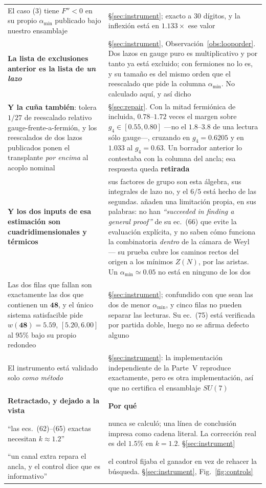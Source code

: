\documentclass[11pt,a4paper]{article}
\newcommand{\su}[1]{SU(#1)}
\newcommand{\rep}[1]{\mathbf{#1}}
\newcommand{\amin}{\alpha_{\min}}
\begin{document}
\begin{longtable}{p{}p{}}
El caso (3) tiene $F''<0$ en su propio $\amin$ publicado bajo nuestro ensamblaje &
\S\ref{sec:instrument}; exacto a 30 dígitos, y la inflexión está en $1.133\times$ ese valor\\
\rowcolor{hdrblue!7}\textbf{La lista de exclusiones anterior es la lista de \emph{un lazo}} &
\S\ref{sec:instrument}, Observación~\ref{obs:looporder}. Dos lazos en gauge puro es multiplicativo y
por tanto ya está excluido; con fermiones no lo es, y su tamaño es del mismo orden que el reescalado
que pide la columna $\amin$. No calculado aquí, y así dicho\\
\rowcolor{warmred!12}\textbf{Y la cuña también}: tolera $1/27$ de reescalado relativo
gauge-frente-a-fermión, y los reescalados de dos lazos publicados ponen el transplante
\emph{por encima} al acoplo nominal &
\S\ref{sec:repair}. Con la mitad fermiónica de \cite{GuoDu} incluida, $0.78$--$1.72$ veces el margen
sobre $g_4\in[0.55,0.80]$ ---no el $1.8$--$3.8$ de una lectura sólo gauge---, cruzando en
$g_4=0.6205$ y en $1.033$ al $g_4=0.63$. Un borrador anterior lo contestaba con la columna del
ancla; esa respuesta queda \textbf{retirada}\\
\rowcolor{warmred!12}\textbf{Y los dos inputs de esa estimación son cuadridimensionales y térmicos} &
sus factores de grupo son esta álgebra, sus integrales de lazo no, y el $6/5$ está hecho de las
segundas. \cite{DGKA} añaden una limitación propia, en sus palabras: no han \emph{``succeeded in
finding a general proof''} de su ec.~(66) que evite la evaluación explícita, y no saben cómo funciona
la combinatoria \emph{dentro} de la cámara de Weyl --- su prueba cubre los caminos rectos del origen
a los mínimos $Z(N)$, por las aristas. Un $\amin\simeq0.05$ no está en ninguno de los dos\\
Las dos filas que fallan son exactamente las dos que contienen un $\rep{48}$, y el único sistema
satisfacible pide $w(\rep{48})=5.59$, $[5.20,6.00]$ al $95\%$ bajo su propio redondeo &
\S\ref{sec:instrument}; confundido con que sean las dos de menor $\amin$, y cinco filas no pueden
separar las lecturas. Su ec.~(75) está verificada por partida doble, luego no se afirma defecto
alguno\\
El instrumento está validado solo \emph{como método} & \S\ref{sec:instrument}: la implementación
independiente de la Parte~V reproduce \cite{AHMN} exactamente, pero es otra implementación, así que
no certifica el ensamblaje $\su7$\\
\midrule
\rowcolor{warmred!14}\textbf{Retractado, y dejado a la vista} & \textbf{Por qué}\\
\midrule
``las ecs.~(62)--(65) exactas necesitan $k\approx1.2$'' & nunca se calculó; una línea de conclusión
impresa como cadena literal. La corrección real es del $1.5\%$ en $k=1.2$. \S\ref{sec:instrument}\\
``un canal extra repara el ancla, y el control dice que es informativo'' & el control fijaba el
ganador en vez de rehacer la búsqueda. \S\ref{sec:instrument}, Fig.~\ref{fig:controls}\\
\bottomrule
\end{longtable}
\endgroup
\end{document}
